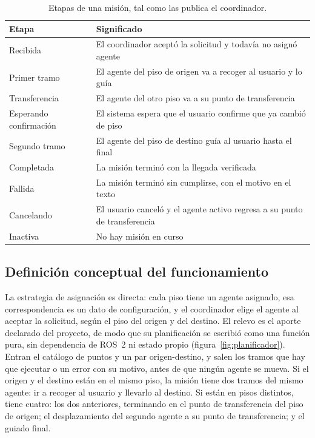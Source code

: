 \begin{table}[H]
  \centering\footnotesize
  \caption{Etapas de una misión, tal como las publica el coordinador.}
  \label{tab:etapas-mision}
  \begin{tabular}{@{}p{}p{}@{}}
    \toprule
    \textbf{Etapa} & \textbf{Significado} \\ \midrule
    Recibida & El coordinador aceptó la solicitud y todavía no asignó agente \\
    Primer tramo & El agente del piso de origen va a recoger al usuario y lo guía \\
    Transferencia & El agente del otro piso va a su punto de transferencia \\
    Esperando confirmación & El sistema espera que el usuario confirme que ya cambió de piso \\
    Segundo tramo & El agente del piso de destino guía al usuario hasta el final \\
    Completada & La misión terminó con la llegada verificada \\
    Fallida & La misión terminó sin cumplirse, con el motivo en el texto \\
    Cancelando & El usuario canceló y el agente activo regresa a su punto de transferencia \\
    Inactiva & No hay misión en curso \\ \bottomrule
  \end{tabular}
\end{table}

\subsection{Definición conceptual del funcionamiento}
\label{sec:planificador}
\label{sec:asignacion}

La estrategia de asignación es directa: cada piso tiene un agente asignado, esa correspondencia es un dato de configuración, y el coordinador elige el agente al aceptar la solicitud, según el piso del origen y del destino. El relevo es el aporte declarado del proyecto, de modo que su planificación se escribió como una función pura, sin dependencia de ROS~2 ni estado propio (figura~\ref{fig:planificador}). Entran el catálogo de puntos y un par origen-destino, y salen los tramos que hay que ejecutar o un error con su motivo, antes de que ningún agente se mueva. Si el origen y el destino están en el mismo piso, la misión tiene dos tramos del mismo agente: ir a recoger al usuario y llevarlo al destino. Si están en pisos distintos, tiene cuatro: los dos anteriores, terminando en el punto de transferencia del piso de origen; el desplazamiento del segundo agente a su punto de transferencia; y el guiado final.

